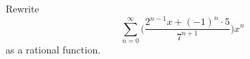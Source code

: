 Rewrite
\[
\sum_{n=0}^\infty \biggl( \frac{2^{n-1}x + (-1)^n \cdot 5}{7^{n+1}}  \biggr) x^n
\]
as a rational function.
